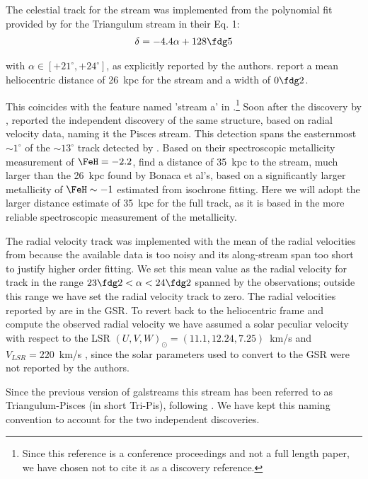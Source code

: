 The celestial track for the stream was implemented from the polynomial fit provided by \citet{Bonaca2012} for the Triangulum stream in their Eq. 1:
\begin{eqnarray*}
\delta = -4.4\alpha + 128\fdg5
\end{eqnarray*}

with $\alpha \in [+21^\circ,+24^\circ]$, as explicitly reported by the authors. \citet{Bonaca2012} report a mean heliocentric 
distance of 26~kpc for the stream and a width of $0\fdg2$. 

This coincides with the feature named 'stream a' in \citet{Grillmair2012}.\footnote{Since this reference is a conference proceedings and not a full length paper, we have chosen not to cite it as a discovery reference.}
Soon after the discovery by \citet{Bonaca2012}, \citet{Martin2013} reported the independent discovery of the same structure, based on radial velocity data, naming it the Pisces stream. This detection spans the easternmost $\sim1^\circ$ of the $\sim13^\circ$ track detected by \citet{Bonaca2012}. Based on their spectroscopic metallicity measurement of $\FeH=-2.2$, \citet{Martin2013} find a distance of 35~kpc to the stream, much larger than the 26~kpc found by Bonaca et al's, based on a significantly larger metallicity of $\FeH\sim -1$ estimated from isochrone fitting. Here we will adopt the larger distance estimate of 35~kpc for the full track, as it is based in the more reliable spectroscopic measurement of the metallicity.

The radial velocity track was implemented with the mean of the radial velocities from \citet{Martin2013} because the available data is too noisy and its along-stream span too short to justify higher order fitting. We set this mean value as the radial velocity for track in the range $23\fdg2<\alpha<24\fdg2$ spanned by the observations; outside this range we have set the radial velocity track to zero. The radial velocities reported by \citet{Martin2013} are in the GSR. To revert back to the heliocentric frame and compute the observed radial velocity we have assumed  a solar peculiar velocity with respect to the LSR $(U,V,W)_\odot=(11.1,12.24,7.25)$~km/s \citet{Schoenrich2010} and  $V_{LSR}=220$~km/s \citep{DehnenBinney1998}, since the solar parameters used to convert to the GSR were not reported by the authors.

Since the previous version of galstreams this stream has been referred to as Triangulum-Pisces (in short Tri-Pis), following \citet{GrillmairCarlin2016}. We have kept this naming convention to account for the two independent discoveries.

